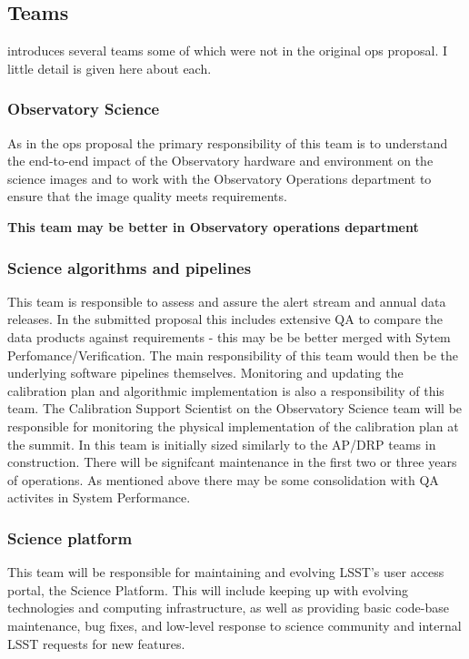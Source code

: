 
\subsection{Teams }\label{sec:teams}
 introduces several teams some of which were not in the original ops proposal. I  little detail is given here about each.

\subsubsection{Observatory Science}
As in the ops proposal the primary responsibility of this team is to understand the end-to-end impact of the Observatory hardware and environment on the science images and to work with the Observatory Operations department to ensure that the image quality meets requirements.

\textbf{This team may be better  in Observatory operations department }

\subsubsection{Science algorithms and pipelines}
This team is responsible to assess and assure the alert stream and annual data releases.
In the submitted proposal this includes extensive \gls{QA} to compare the data products against requirements -
this may be be better merged with Sytem Perfomance/Verification.
The main responsibility  of this team  would then be the  underlying \gls{software} pipelines themselves. Monitoring and updating the calibration plan and algorithmic implementation is also a responsibility of this team. The Calibration Support Scientist on the Observatory Science team will be responsible for monitoring the physical implementation of the calibration plan at the summit.
In  this team is initially sized similarly to the AP/DRP teams in construction. There will be signifcant maintenance in the first two or three years of operations. As mentioned above there may be some consolidation with \gls{QA} activites in System Performance.

\subsubsection{Science platform  }
This team will be responsible for maintaining and evolving LSST’s user access portal, the Science Platform. This will include keeping up with evolving technologies and computing infrastructure, as well as providing basic code-base maintenance, bug fixes, and low-level response to science community and internal \gls{LSST} requests for new features.

